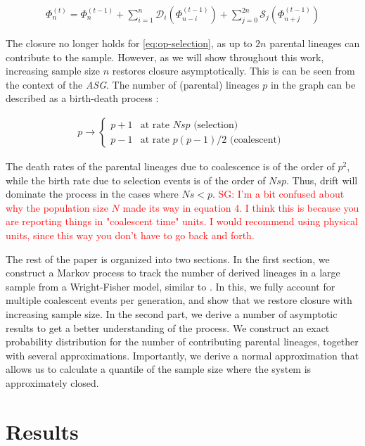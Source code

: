 \documentclass[review]{elsarticle}
\newcommand{\ra}{\rightarrow}
\newcommand{\sgcomment}[1]{\textcolor{red}{SG: #1}}
\begin{document}
\begin{align}
  \label{eq:op-selection}
  \Phi_{n}^{(t)}=\Phi_{n}^{(t-1)}+\sum_{i=1}^{n}\mathcal{D}_i(\Phi_{n-i}^{(t-1)}) + \sum_{j=0}^{2n}\mathcal{S}_j(\Phi_{n+j}^{(t-1)})
\end{align}

The closure no longer holds for \eqref{eq:op-selection}, as up to $2n$ parental lineages can
contribute to the sample. However, as we will show throughout this work, increasing sample size $n$
restores closure asymptotically. This is can be seen from the context of the \textit{ASG}. The
number of (parental) lineages $p$ in the graph can be described as a birth-death process
\cite{KroneNeuhauser1997, Wakeley2009}:

\begin{align}
  \label{eq:asg-size}
  p \ra \begin{cases}
      p+1 & \text{at rate } Nsp  \text{ (selection) }\\
      p-1 & \text{at rate } p (p-1)/2 \text{ (coalescent) }
    \end{cases}
\end{align}

The death rates of the parental lineages due to coalescence is of the order of $p^2$, while the
birth rate due to selection events is of the order of $Nsp$. Thus, drift will dominate the process in
the cases where $Ns < p$. \sgcomment{I'm a bit confused about why the population size $N$ made its way in equation 4. I think this is because you are reporting things in "coalescent time" units. I would recommend using physical units, since this way you don't have to go back and forth.  }

The rest of the paper is organized into two sections. In the first section, we construct a Markov
process to track the number of derived lineages in a large sample from a Wright-Fisher model,
similar to \cite{JouganousEtAl2017,KammEtAl2017}. In this, we fully account for multiple coalescent
events per generation, and show that we restore closure with increasing sample size. In the second
part, we derive a number of asymptotic results to get a better understanding of the process. We
construct an exact probability distribution for the number of contributing parental lineages,
together with several approximations. Importantly, we derive a normal approximation that allows us
to calculate a quantile of the sample size where the system is approximately closed.

\section{Results}
\label{sec:results}
\end{document}
